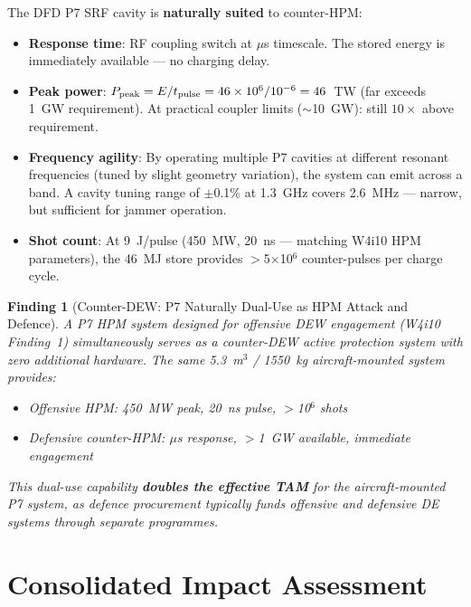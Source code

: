 \documentclass[11pt]{article}
\newtheorem{finding}{Finding}
\newcommand{\ee}[1]{\times 10^{#1}}
\begin{document}
The DFD P7 SRF cavity is \textbf{naturally suited} to counter-HPM:
\begin{itemize}[nosep]
  \item \textbf{Response time}: RF coupling switch at $\mu$s timescale.
    The stored energy is immediately available --- no charging delay.
  \item \textbf{Peak power}: $P_{\rm peak} = E/t_{\rm pulse}
    = 46\ee{6}/10^{-6} = 46$~TW (far exceeds 1~GW requirement).
    At practical coupler limits ($\sim$10~GW): still $10\times$
    above requirement.
  \item \textbf{Frequency agility}: By operating multiple P7 cavities
    at different resonant frequencies (tuned by slight geometry
    variation), the system can emit across a band. A cavity tuning
    range of $\pm$0.1\% at 1.3~GHz covers 2.6~MHz --- narrow, but
    sufficient for jammer operation.
  \item \textbf{Shot count}: At 9~J/pulse (450~MW, 20~ns ---
    matching W4i10 HPM parameters), the 46~MJ store provides
    $>$5$\times$10$^6$ counter-pulses per charge cycle.
\end{itemize}

\begin{finding}[Counter-DEW: P7 Naturally Dual-Use as HPM Attack and Defence]
\label{find:counter-DEW}
A P7 HPM system designed for offensive DEW engagement (W4i10 Finding~1)
simultaneously serves as a counter-DEW active protection system with
zero additional hardware. The same 5.3~m$^3$ / 1550~kg aircraft-mounted
system provides:
\begin{itemize}[nosep]
  \item Offensive HPM: 450~MW peak, 20~ns pulse, $>$10$^6$ shots
  \item Defensive counter-HPM: $\mu$s response, $>$1~GW available,
    immediate engagement
\end{itemize}

This dual-use capability \textbf{doubles the effective TAM} for
the aircraft-mounted P7 system, as defence procurement typically
funds offensive and defensive DE systems through separate programmes.
\end{finding}

\part{Consolidated Impact Assessment}
\label{part:impact}
\end{document}
